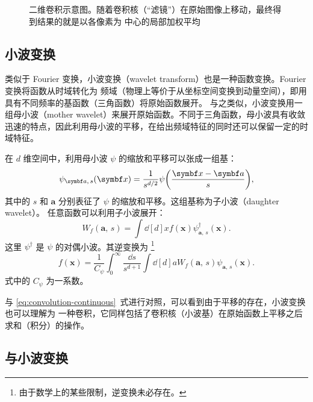 \begin{figure}[htb]
  \centering
  \caption{二维卷积示意图。随着卷积核（“滤镜”）在原始图像上移动，最终得到结果的就是以各像素为
    中心的局部加权平均}
  \label{fig:convolution}
\end{figure}

\subsection{小波变换}

类似于 Fourier 变换，小波变换（wavelet transform）也是一种函数变换。Fourier 变换将函数从时域转化为
频域（物理上等价于从坐标空间变换到动量空间），即用具有不同频率的基函数（三角函数）将原始函数展开。
与之类似，小波变换用一组母小波（mother wavelet）来展开原始函数。不同于三角函数，母小波具有收敛
迅速的特点，因此利用母小波的平移，在给出频域特征的同时还可以保留一定的时域特征。

在 $d$ 维空间中，利用母小波 $\psi$ 的缩放和平移可以张成一组基：
\begin{equation}
  \label{eq:daughter-wavelet}
  \psi_{\bm{a},\,s}(\bm{x}) = \frac{1}{s^{d/2}} \psi\qty(\frac{\bm{x}-\bm{a}}{s}),
\end{equation}
其中的 $s$ 和 $\bm{a}$ 分别表征了 $\psi$ 的缩放和平移。这组基称为子小波（daughter wavelet）。
任意函数可以利用子小波展开：
\begin{equation}
  W_f(\bm{a},\,s) = \int \dd[d]{x} f(\bm{x}) \psi^\dagger_{\bm{a},\,s}(\bm{x}).
\end{equation}
这里 $\psi^\dagger$ 是 $\psi$ 的对偶小波。其逆变换为
\footnote{由于数学上的某些限制，逆变换未必存在。}
\begin{equation}
  f(\bm{x}) = \frac{1}{C_\psi} \int_0^\infty \frac{\dd{s}}{s^{d+1}}
              \int \dd[d]{a} W_f(\bm{a},\,s) \psi_{\bm{a},\,s}(\bm{x}).
\end{equation}
式中的 $C_\psi$ 为一系数。

与 \eqref{eq:convolution-continuous}~式进行对照，可以看到由于平移的存在，小波变换也可以理解为
一种卷积，它同样包括了卷积核（小波基）在原始函数上平移之后求和（积分）的操作。

\subsection{\AdSCFT{} 与小波变换}


